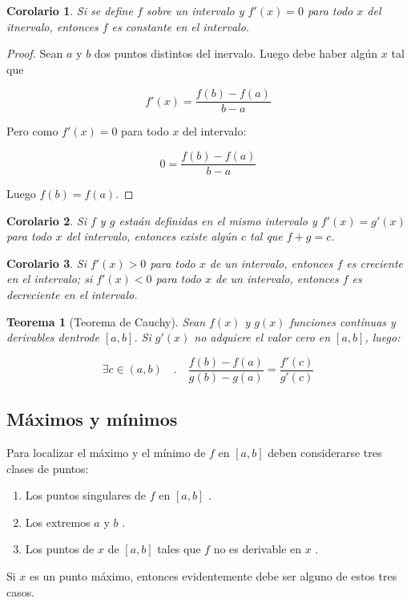 \documentclass[12pt,a4paper]{extarticle}
\newtheorem{theorem}{Teorema}[section]
\newtheorem{corol}{Corolario}[theorem]
\begin{document}
\begin{corol}
Si se define \(f\) sobre un intervalo y \(f'(x)=0\) para todo \(x\)
del itnervalo, entonces \(f\) es constante en el intervalo.
\end{corol}
\begin{proof}
Sean \(a\) y \(b\) dos puntos distintos del inervalo. Luego debe haber alg\'un
\(x\) tal que 

\[f'(x)=\frac{f(b)-f(a)}{b-a}\]

Pero como \(f'(x)=0\) para todo \(x\) del intervalo:

\[0=\frac{f(b)-f(a)}{b-a}\]

Luego \(f(b) = f(a) \).

\end{proof}
\begin{corol}
Si \(f\) y \(g\) esta\'an definidas en el mismo intervalo y \(f'(x) = g'(x)\)
para todo \(x\) del intervalo, entonces existe alg\'un \(c\) tal que \(f + g =
c \).
\end{corol}

\begin{corol}
Si \(f'(x) > 0\) para todo \(x\) de un intervalo, entonces \(f\) es
creciente en el intervalo; si \(f'(x) < 0\) para todo \(x\) de un intervalo, entonces \(f\) es
decreciente en el intervalo.
\end{corol}
\begin{theorem}[Teorema de Cauchy]
Sean \(f(x)\) y \(g(x)\) funciones cont\'inuas y derivables dentrode
\([a,b]\). Si \(g'(x)\) no adquiere el valor cero en \([a,b]\), luego:

\[ \exists c \in (a,b) \quad . \quad \frac{f(b)-f(a)}{g(b)-g(a)} = \frac{f'(c)}{g'(c)} \]
\end{theorem}
\subsection{M\'aximos y m\'inimos}
Para localizar el m\'aximo y el m\'inimo de \( f \) en \( [a,b] \)  deben considerarse
tres clases de puntos:

\begin{enumerate}
\item Los puntos singulares de \( f \) en \( [a,b] \) .
\item Los extremos \( a \) y \( b \) .
\item Los puntos de \( x \)  de \( [a,b] \)  tales que \( f \) no es
  derivable en \( x \) .
\end{enumerate}

Si \( x \) es un punto m\'aximo, entonces evidentemente debe ser
alguno de estos tres casos.
\end{document}
